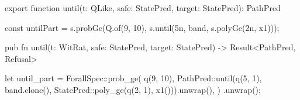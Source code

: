 \begin{tssrc}
export function until(t: QLike, safe: StatePred, target: StatePred): PathPred
\end{tssrc}
\begin{tssrc}
const untilPart = s.probGe(Q.of(9, 10), s.until(5n, band, s.polyGe(2n, x1)));
\end{tssrc}
\begin{rustsrc}
pub fn until(t: WitRat, safe: StatePred, target: StatePred) -> Result<PathPred, Refusal>
\end{rustsrc}
\begin{rustsrc}
let until_part = ForallSpec::prob_ge(
    q(9, 10),
    PathPred::until(q(5, 1), band.clone(), StatePred::poly_ge(q(2, 1), x1())).unwrap(),
)
.unwrap();
\end{rustsrc}
